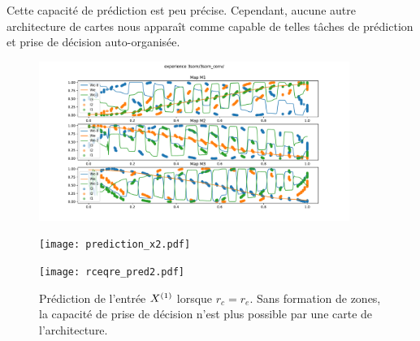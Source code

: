 \documentclass[../main]{subfiles}
\begin{document}
Cette capacité de prédiction est peu précise. Cependant, aucune autre architecture de cartes nous apparaît comme capable de telles tâches de prédiction et prise de décision auto-organisée.


\begin{figure}
	\centering\includegraphics[width=0.9\textwidth]{3som_cercle_w.pdf}
	\caption{\label{fig:w_cercle}}
\end{figure}

\begin{figure}
	\texttt{[image: prediction\_x2.pdf]}
	\caption{\label{fig:pred_cercle}}
\end{figure}

\begin{figure}
	\texttt{[image: rceqre\_pred2.pdf]}
	\caption{Prédiction de l'entrée $X^{({1})}$ lorsque $r_c = r_e$. Sans formation de zones, la capacité de prise de décision n'est plus possible par une carte de l'architecture. \label{fig:rcre_pred}}
\end{figure}


\end{document}
